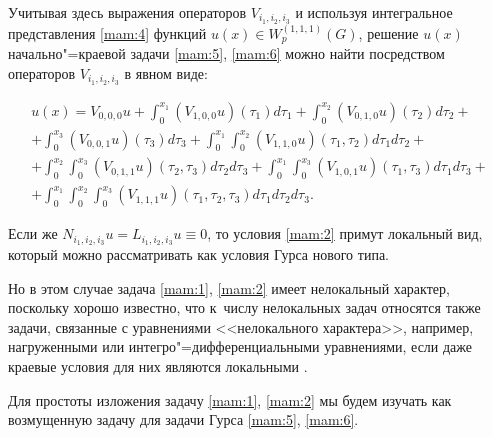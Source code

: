 Учитывая здесь выражения операторов $V_{i_1  , i_2  , i_3  }$  и используя интегральное представления \eqref{mam:4} функций  $u(x) \in W_{p} ^{(1, 1, 1) } \left( G\right)$, решение $u(x) $  начально"=краевой задачи \eqref{mam:5}, \eqref{mam:6} можно найти посредством операторов  $V_{i_1  , i_2  , i_3  }$ в явном виде:

\begin{multline*}

u(x) =V_{0, 0, 0} u+\int_{0}^{x_1  }( V_{1, 0, 0}u ) \left( \tau _1  \right) d \tau _1  +

\int_{0}^{x_2 }\left( V_{0, 1, 0} u\right) \left( \tau _2  \right) d \tau _2 +

\\

+

\int_{0}^{x_3  }\left( V_{0, 0, 1} u\right) \left( \tau _3  \right)d \tau _3  

+\int_{0}^{x_1  }\int_{0}^{x_2  }\left( V_{1, 1, 0} u\right)\left( \tau _1  ,\tau _2  \right) d\tau _1  d\tau _2 +

\\+

\int_{0}^{x_2  }\int_{0}^{x_3  }\left( V_{0, 1, 1} u\right)\left( \tau _2  ,\tau _3  \right) d\tau _2  d\tau _3 

+\int_{0}^{x_1  }\int_{0}^{x_3  }\left( V_{1,0,1} u\right)\left( \tau _1  ,\tau _3  \right) d\tau _1  d\tau _3  +

\\+

\int_{0}^{x_1  }\int_{0}^{x_2  }\int_{0}^{x_3 }\left( V_{1,1,1} u\right) \left( \tau _1  ,\tau _2  ,\tau _3  \right)d\tau _1  d\tau _2  d\tau_3 .

\end{multline*}



Если же $N_{i_1  , i_2  , i_3  } u=L_{i_1  , i_2  , i_3  } u\equiv 0$, то условия \eqref{mam:2} примут локальный вид, который можно рассматривать как условия Гурса нового типа. 

Но в этом случае задача \eqref{mam:1}, \eqref{mam:2} имеет нелокальный характер, поскольку хорошо известно, что к~числу нелокальных задач относятся также задачи, связанные с уравнениями <<нелокального характера>>, например, нагруженными или интегро"=дифференциальными уравнениями, если даже краевые условия для них являются локальными \cite{mam:bib:25}.



Для простоты изложения задачу \eqref{mam:1}, \eqref{mam:2} мы будем изучать как возмущенную задачу для задачи Гурса \eqref{mam:5}, \eqref{mam:6}.



